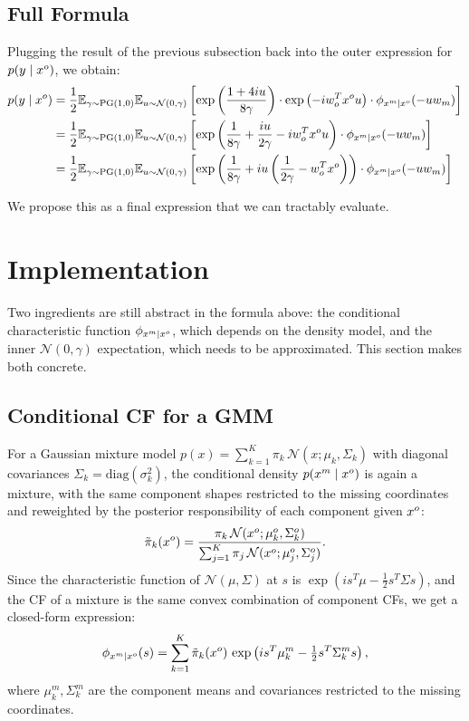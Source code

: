 \subsection{Full Formula}

Plugging the result of the previous subsection back into the outer
expression for $p(y \mid x^o)$, we obtain:
\begin{align*}
  p(y \mid x^o)
  &= \frac{1}{2} \mathbb{E}_{\gamma \sim \mathrm{PG}(1,0)} \mathbb{E}_{u \sim \mathcal{N}(0, \gamma)}
     \left[ \exp \left(\frac{1 + 4iu}{8\gamma}\right)
     \cdot \exp\left(-iw_o^T x^o u\right) \cdot \phi_{x^m \mid x^o}(-uw_m) \right] \\
  &= \frac{1}{2} \mathbb{E}_{\gamma \sim \mathrm{PG}(1,0)} \mathbb{E}_{u \sim \mathcal{N}(0, \gamma)}
     \left[ \exp \left(\frac{1}{8\gamma} + \frac{iu}{2\gamma} - iw_o^T x^o u\right)
     \cdot \phi_{x^m \mid x^o}(-uw_m) \right] \\
  &= \frac{1}{2} \mathbb{E}_{\gamma \sim \mathrm{PG}(1,0)} \mathbb{E}_{u \sim \mathcal{N}(0, \gamma)}
     \left[ \exp \left(\frac{1}{8\gamma} + iu \left(\frac{1}{2\gamma} - w_o^T x^o\right)\right)
     \cdot \phi_{x^m \mid x^o}(-uw_m) \right]
\end{align*}

We propose this as a final expression that we can tractably evaluate.

\section{Implementation}

Two ingredients are still abstract in the formula above: the conditional
characteristic function $\phi_{x^m \mid x^o}$, which depends on the
density model, and the inner $\mathcal{N}(0, \gamma)$ expectation, which
needs to be approximated. This section makes both concrete.

\subsection{Conditional CF for a GMM}

For a Gaussian mixture model $p(x) = \sum_{k=1}^{K} \pi_k \,
\mathcal{N}(x; \mu_k, \Sigma_k)$ with diagonal covariances $\Sigma_k =
\mathrm{diag}(\sigma_k^2)$, the conditional density $p(x^m \mid x^o)$ is
again a mixture, with the same component shapes restricted to the missing
coordinates and reweighted by the posterior responsibility of each
component given $x^o$:
\[
  \tilde{\pi}_k(x^o) = \frac{\pi_k \, \mathcal{N}(x^o; \mu_k^o, \Sigma_k^o)}{\sum_{j=1}^{K} \pi_j \, \mathcal{N}(x^o; \mu_j^o, \Sigma_j^o)}.
\]
Since the characteristic function of $\mathcal{N}(\mu, \Sigma)$ at $s$ is
$\exp \left( i s^T \mu - \tfrac{1}{2} s^T \Sigma s \right)$, and the CF of
a mixture is the same convex combination of component CFs, we get a
closed-form expression:
\[
  \phi_{x^m \mid x^o}(s) = \sum_{k=1}^{K} \tilde{\pi}_k(x^o) \,
  \exp \left( i s^T \mu_k^m - \tfrac{1}{2} s^T \Sigma_k^m s \right),
\]
where $\mu_k^m, \Sigma_k^m$ are the component means and covariances
restricted to the missing coordinates.

